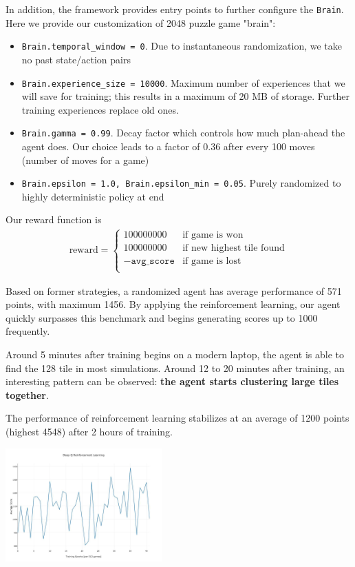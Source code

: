 \documentclass[9pt,twocolumn]{article}
\begin{document}
In addition, the framework provides entry points to further configure the \texttt{Brain}. Here we provide our customization of 2048 puzzle game "brain":

\begin{itemize}

\item \texttt{Brain.temporal\_window = 0}. Due to instantaneous randomization, we take no past state/action pairs
\item \texttt{Brain.experience\_size = 10000}. Maximum number of experiences that we will save for training; this results in a maximum of 20 MB of storage. Further training experiences replace old ones.
\item \texttt{Brain.gamma = 0.99}. Decay factor which controls how much plan-ahead the agent does. Our choice leads to a factor of 0.36 after every 100 moves (number of moves for a game)
\item \texttt{Brain.epsilon = 1.0, Brain.epsilon\_min = 0.05}. Purely randomized to highly deterministic policy at end

\end{itemize}

Our reward function is \begin{align*}
\text{reward} =
\begin{cases}
100000000 & \text{if game is won} \\
100000000 & \text{if new highest tile found} \\
-\texttt{avg\_score} & \text{if game is lost} \\
\end{cases}
\end{align*}

Based on former strategies, a randomized agent has average performance of 571 points, with maximum 1456. By applying the reinforcement learning, our agent quickly surpasses this benchmark and begins generating scores up to 1000 frequently.

Around 5 minutes after training begins on a modern laptop, the agent is able to find the 128 tile in most simulations. Around 12 to 20 minutes after training, an interesting pattern can be observed: \textbf{the agent starts clustering large tiles together}.

The performance of reinforcement learning stabilizes at an average of 1200 points (highest 4548) after 2 hours of training.

\begin{centering}

\includegraphics[width=60mm]{rl_graph.jpg}

\end{centering}
\end{document}
